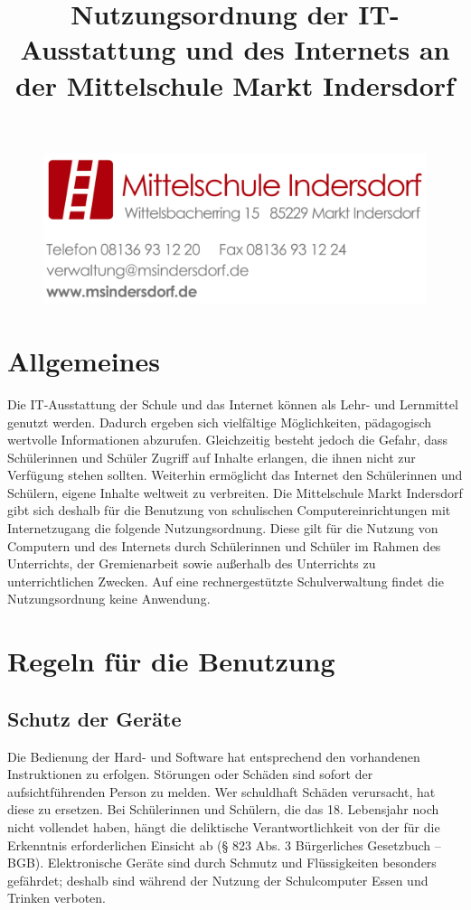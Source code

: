 \documentclass[a4paper, parskip]{scrartcl}
\title{Nutzungsordnung der IT-Ausstattung und des Internets an der
Mittelschule Markt Indersdorf}
\date{}
\begin{document}
\begin{figure}[h]
	\flushright
	\includegraphics{logo_briefkopf}
	\maketitle
\end{figure}

\section{Allgemeines}
Die IT-Ausstattung der Schule und das Internet können als Lehr- und Lernmittel
genutzt werden. Dadurch ergeben sich vielfältige Möglichkeiten, pädagogisch
wertvolle Informationen abzurufen. Gleichzeitig besteht jedoch die Gefahr, dass
Schülerinnen und Schüler Zugriff auf Inhalte erlangen, die ihnen nicht zur
Verfügung stehen sollten. Weiterhin ermöglicht das Internet den Schülerinnen
und Schülern, eigene Inhalte weltweit zu verbreiten.  Die Mittelschule Markt
Indersdorf gibt sich deshalb für die Benutzung von schulischen
Computereinrichtungen mit Internetzugang die folgende Nutzungsordnung. Diese
gilt für die Nutzung von Computern und des Internets durch Schülerinnen und
Schüler im Rahmen des Unterrichts, der Gremienarbeit sowie außerhalb des
Unterrichts zu unterrichtlichen Zwecken. Auf eine rechnergestützte
Schulverwaltung findet die Nutzungsordnung keine Anwendung.

\section{Regeln für die Benutzung}
\subsection{Schutz der Geräte}
Die Bedienung der Hard- und Software hat entsprechend den vorhandenen
Instruktionen zu erfolgen. Störungen oder Schäden sind sofort der
aufsichtführenden Person zu melden. Wer schuldhaft Schäden verursacht, hat
diese zu ersetzen. Bei Schülerinnen und Schülern, die das 18. Lebensjahr noch
nicht vollendet haben, hängt die deliktische Verantwortlichkeit von der für die
Erkenntnis erforderlichen Einsicht ab (§ 823 Abs. 3 Bürgerliches Gesetzbuch –
BGB). Elektronische Geräte sind durch Schmutz und Flüssigkeiten besonders
gefährdet; deshalb sind während der Nutzung der Schulcomputer Essen und Trinken
verboten.
\end{document}
